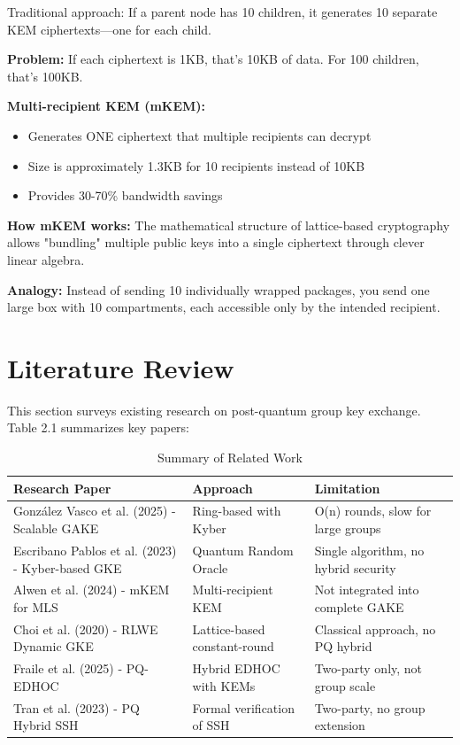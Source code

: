 \documentclass[12pt,a4paper]{report}
\begin{document}
Traditional approach: If a parent node has 10 children, it generates 10 separate KEM ciphertexts—one for each child.

\textbf{Problem:} If each ciphertext is 1KB, that's 10KB of data. For 100 children, that's 100KB.

\textbf{Multi-recipient KEM (mKEM):}
\begin{itemize}
\item Generates ONE ciphertext that multiple recipients can decrypt
\item Size is approximately 1.3KB for 10 recipients instead of 10KB
\item Provides 30-70\% bandwidth savings
\end{itemize}

\textbf{How mKEM works:} The mathematical structure of lattice-based cryptography allows "bundling" multiple public keys into a single ciphertext through clever linear algebra.

\textbf{Analogy:} Instead of sending 10 individually wrapped packages, you send one large box with 10 compartments, each accessible only by the intended recipient.

\section{Literature Review}

This section surveys existing research on post-quantum group key exchange. Table 2.1 summarizes key papers:

\begin{table}[H]
\centering
\caption{Summary of Related Work}
\label{tab:lit_review}
\footnotesize
\begin{tabular}{|p{}|p{}|p{}|}
\hline
\textbf{Research Paper} & \textbf{Approach} & \textbf{Limitation} \\
\hline
González Vasco et al. (2025) - Scalable GAKE & Ring-based with Kyber & O(n) rounds, slow for large groups \\
\hline
Escribano Pablos et al. (2023) - Kyber-based GKE & Quantum Random Oracle & Single algorithm, no hybrid security \\
\hline
Alwen et al. (2024) - mKEM for MLS & Multi-recipient KEM & Not integrated into complete GAKE \\
\hline
Choi et al. (2020) - RLWE Dynamic GKE & Lattice-based constant-round & Classical approach, no PQ hybrid \\
\hline
Fraile et al. (2025) - PQ-EDHOC & Hybrid EDHOC with KEMs & Two-party only, not group scale \\
\hline
Tran et al. (2023) - PQ Hybrid SSH & Formal verification of SSH & Two-party, no group extension \\
\hline
\end{tabular}
\end{table}
\end{document}
